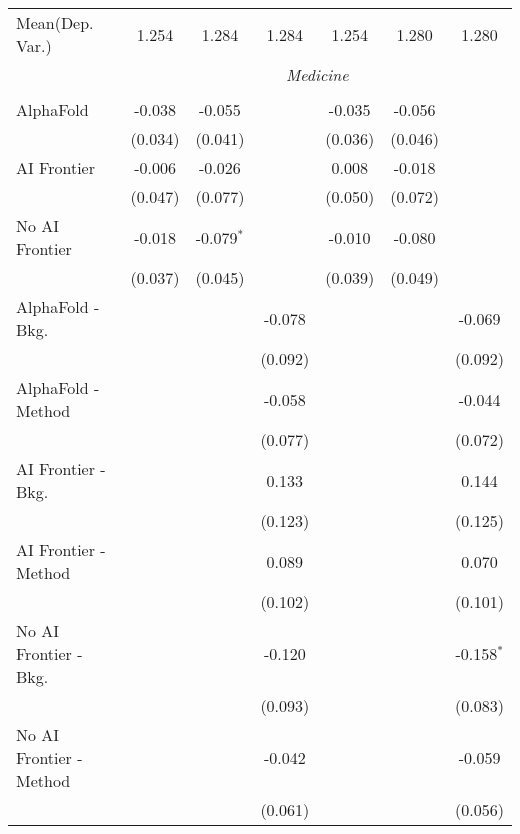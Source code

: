 \begin{tabular}{lcccccc}
Mean(Dep. Var.) & 1.254 & 1.284 & 1.284 & 1.254 & 1.280 & 1.280 \\
 & \multicolumn{6}{c}{\textit{Medicine}} \\ \\
   AlphaFold               & -0.038  & -0.055       &         & -0.035  & -0.056  &   \\   
                           & (0.034) & (0.041)      &         & (0.036) & (0.046) &   \\   
   AI Frontier             & -0.006  & -0.026       &         & 0.008   & -0.018  &   \\   
                           & (0.047) & (0.077)      &         & (0.050) & (0.072) &   \\   
   No AI Frontier          & -0.018  & -0.079$^{*}$ &         & -0.010  & -0.080  &   \\   
                           & (0.037) & (0.045)      &         & (0.039) & (0.049) &   \\   
   AlphaFold - Bkg.        &         &              & -0.078  &         &         & -0.069\\   
                           &         &              & (0.092) &         &         & (0.092)\\   
   AlphaFold - Method      &         &              & -0.058  &         &         & -0.044\\   
                           &         &              & (0.077) &         &         & (0.072)\\   
   AI Frontier - Bkg.      &         &              & 0.133   &         &         & 0.144\\   
                           &         &              & (0.123) &         &         & (0.125)\\   
   AI Frontier - Method    &         &              & 0.089   &         &         & 0.070\\   
                           &         &              & (0.102) &         &         & (0.101)\\   
   No AI Frontier - Bkg.   &         &              & -0.120  &         &         & -0.158$^{*}$\\   
                           &         &              & (0.093) &         &         & (0.083)\\   
   No AI Frontier - Method &         &              & -0.042  &         &         & -0.059\\   
                           &         &              & (0.061) &         &         & (0.056)\\   

\end{tabular}

